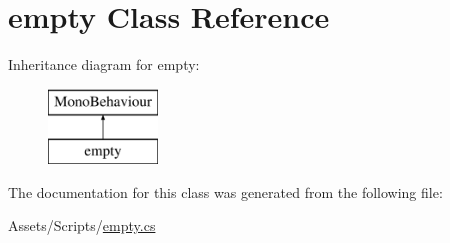 \hypertarget{classempty}{}\section{empty Class Reference}
\label{classempty}
Inheritance diagram for empty\+:\begin{figure}[H]
\begin{center}
\leavevmode
\includegraphics[height=2.000000cm]{classempty}
\end{center}
\end{figure}


The documentation for this class was generated from the following file\+:\begin{DoxyCompactItemize}
\item 
Assets/\+Scripts/\mbox{\hyperlink{empty_8cs}{empty.\+cs}}\end{DoxyCompactItemize}
